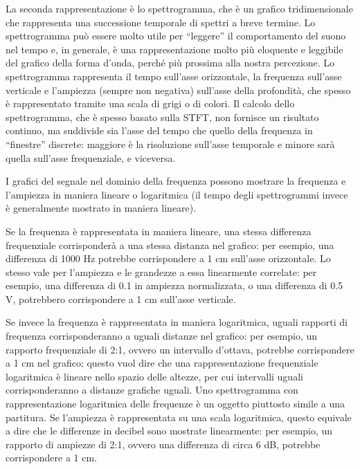 La seconda rappresentazione è lo spettrogramma, che è un grafico tridimensionale che rappresenta una successione temporale di spettri a breve termine. Lo spettrogramma può essere molto utile per ``leggere'' il comportamento del suono nel tempo e, in generale, è una rappresentazione molto più eloquente e leggibile del grafico della forma d'onda, perché più prossima alla nostra percezione. Lo spettrogramma rappresenta il tempo sull'asse orizzontale, la frequenza sull'asse verticale e l'ampiezza (sempre non negativa) sull'asse della profondità, che spesso è rappresentato tramite una scala di grigi o di colori. Il calcolo dello spettrogramma, che è spesso basato sulla STFT, non fornisce un risultato continuo, ma suddivide sia l'asse del tempo che quello della frequenza in ``finestre'' discrete: maggiore è la risoluzione sull'asse temporale e minore sarà quella sull'asse frequenziale, e viceversa. 

I grafici del segnale nel dominio della frequenza possono mostrare la frequenza e l'ampiezza in maniera lineare o logaritmica (il tempo degli spettrogrammi invece è generalmente mostrato in maniera lineare).

Se la frequenza è rappresentata in maniera lineare, una stessa differenza frequenziale corrisponderà a una stessa distanza nel grafico: per esempio, una differenza di 1000 Hz potrebbe corrispondere a 1 cm sull'asse orizzontale. Lo stesso vale per l'ampiezza e le grandezze a essa linearmente correlate: per esempio, una differenza di 0.1 in ampiezza normalizzata, o una differenza di 0.5 V, potrebbero corrispondere a 1 cm sull'asse verticale. 

Se invece la frequenza è rappresentata in maniera logaritmica, uguali rapporti di frequenza corrisponderanno a uguali distanze nel grafico: per esempio, un rapporto frequenziale di 2:1, ovvero un intervallo d'ottava, potrebbe corrispondere a 1 cm nel grafico; questo vuol dire che una rappresentazione frequenziale logaritmica è lineare nello spazio delle altezze, per cui intervalli uguali corrisponderanno a distanze grafiche uguali. Uno spettrogramma con rappresentazione logaritmica delle frequenze è un oggetto piuttosto simile a una partitura. Se l'ampiezza è rappresentata su una scala logaritmica, questo equivale a dire che le differenze in decibel sono mostrate linearmente: per esempio, un rapporto di ampiezze di 2:1, ovvero una differenza di circa 6 dB, potrebbe corrispondere a 1 cm. 





